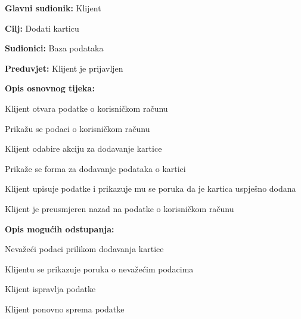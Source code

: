\noindent {}
\begin{packed_item}
	
	\item \textbf{Glavni sudionik:} Klijent
	\item  \textbf{Cilj:} Dodati karticu
	\item  \textbf{Sudionici:} Baza podataka
	\item  \textbf{Preduvjet:} Klijent je prijavljen
	\item  \textbf{Opis osnovnog tijeka:}
	
	\item[] \begin{packed_enum}
		
		\item Klijent otvara podatke o korisničkom računu
		\item Prikažu se podaci o korisničkom računu
		\item Klijent odabire akciju za dodavanje kartice
		\item Prikaže se forma za dodavanje podataka o kartici
		\item Klijent upisuje podatke i prikazuje mu se poruka da je kartica uspješno dodana
		\item Klijent je preusmjeren nazad na podatke o korisničkom računu
	
	\end{packed_enum}
	
	\item  \textbf{Opis mogućih odstupanja:}
	
	\item[] \begin{packed_item}
		
		\item[6.a] Nevažeći podaci prilikom dodavanja kartice
		\item[] \begin{packed_enum}
			
			\item Klijentu se prikazuje poruka o nevažećim podacima
			\item Klijent ispravlja podatke
			\item Klijent ponovno sprema podatke
			
		\end{packed_enum}
		
	\end{packed_item}
\end{packed_item}

